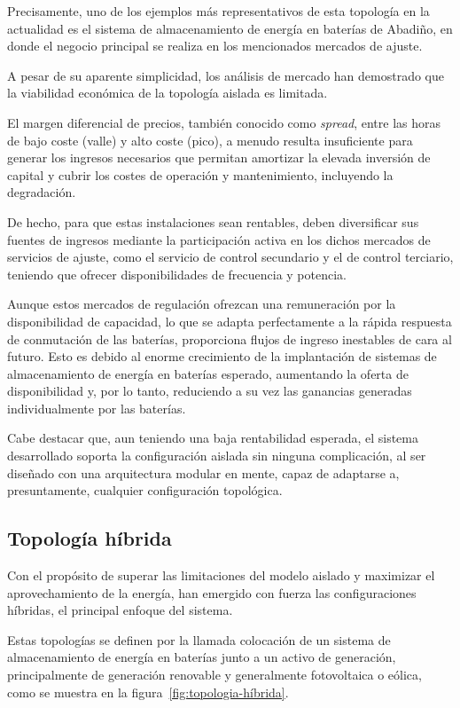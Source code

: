 Precisamente, uno de los ejemplos más representativos de esta topología en la actualidad es el sistema de almacenamiento de energía en baterías de Abadiño, en donde el negocio principal se realiza en los mencionados mercados de ajuste.

A pesar de su aparente simplicidad, los análisis de mercado han demostrado que la viabilidad económica de la topología aislada es limitada. 

El margen diferencial de precios, también conocido como \textit{spread}, entre las horas de bajo coste (valle) y alto coste (pico), a menudo resulta insuficiente para generar los ingresos necesarios que permitan amortizar la elevada inversión de capital y cubrir los costes de operación y mantenimiento, incluyendo la degradación.

De hecho, para que estas instalaciones sean rentables, deben diversificar sus fuentes de ingresos mediante la participación activa en los dichos mercados de servicios de ajuste, como el servicio de control secundario y el de control terciario, teniendo que ofrecer disponibilidades de frecuencia y potencia.

Aunque estos mercados de regulación ofrezcan una remuneración por la disponibilidad de capacidad, lo que se adapta perfectamente a la rápida respuesta de conmutación de las baterías, proporciona flujos de ingreso inestables de cara al futuro. Esto es debido al enorme crecimiento de la implantación de sistemas de almacenamiento de energía en baterías esperado, aumentando la oferta de disponibilidad y, por lo tanto, reduciendo a su vez las ganancias generadas individualmente por las baterías.

Cabe destacar que, aun teniendo una baja rentabilidad esperada, el sistema desarrollado soporta la configuración aislada sin ninguna complicación, al ser diseñado con una arquitectura modular en mente, capaz de adaptarse a, presuntamente, cualquier configuración topológica.

\subsection{Topología híbrida}
\label{makereference3.1.2}

Con el propósito de superar las limitaciones del modelo aislado y maximizar el aprovechamiento de la energía, han emergido con fuerza las configuraciones híbridas, el principal enfoque del sistema.

Estas topologías se definen por la llamada colocación de un sistema de almacenamiento de energía en baterías junto a un activo de generación, principalmente de generación renovable y generalmente fotovoltaica o eólica, como se muestra en la figura~\ref{fig:topologia-híbrida}.

